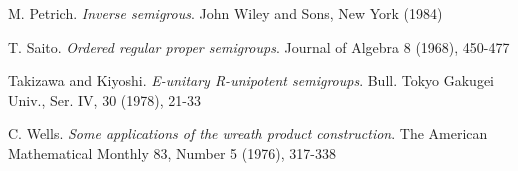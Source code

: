 \documentclass[12pt,a4paper,twoside]{report}
\theoremstyle{remark}
\theoremstyle{example}
\begin{document}
\begin{thebibliography}{x}
 M. Petrich. {\it Inverse semigrous}. John Wiley and Sons, New York (1984)

 T. Saito. {\it Ordered regular proper semigroups}. Journal of Algebra 8 (1968), 450-477

 Takizawa and Kiyoshi. {\it E-unitary R-unipotent semigroups}. Bull. Tokyo Gakugei Univ., Ser. IV, 30 (1978), 21-33

 C. Wells. {\it Some applications of the wreath product construction}. The American Mathematical Monthly 83, Number 5 (1976), 317-338





\end{thebibliography}
\end{document}
